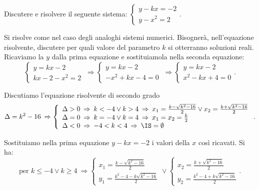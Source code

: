 \begin{exrig}
\begin{esempio}
Discutere e risolvere il seguente sistema: $\left\{\begin{array}{l}y-kx=-2\\y-x^2=2\end{array}\right.$.

Si risolve come nel caso degli analoghi sistemi numerici. Bisognerà, nell'equazione risolvente, discutere per quali valore del parametro $k$ si otterranno soluzioni reali. Ricaviamo la $y$ dalla prima equazione e sostituiamola nella seconda equazione:
\[ \left\{\begin{array}{l}y=kx-2\\kx-2-x^2=2\end{array}\right.\ \Rightarrow\left\{\begin{array}{l}y=kx-2\\-x^2+kx-4=0\end{array}\right.\ \Rightarrow\left\{\begin{array}{l}y=kx-2\\x^2-kx+4=0\end{array}\right.. \]

Discutiamo l'equazione risolvente di secondo grado 
\[ \Delta =k^2-16 \:\Rightarrow\left\{
\begin{array}{l}\Delta >0\:\Rightarrow\: k<-4\vee k>4\:\Rightarrow\: x_1=\frac{k-\sqrt{k^2-16}} 2\vee x_2=\frac{k+\sqrt{k^2-16}} 2\\
\Delta =0\:\Rightarrow\: k=-4\vee k=4\:\Rightarrow\: x_1=x_2=\frac k 2 \\
\Delta <0\:\Rightarrow\: -4<k<4\:\Rightarrow\: \IS=\emptyset \end{array}\right.. \]

Sostituiamo nella prima equazione $y-kx=-2$ i valori della $x$ così ricavati. Si ha: \[ \text{per } k\le -4\vee k\ge 4\:\Rightarrow \left\{\begin{array}{l}x_1=\frac{k-\sqrt{k^2-16}} 2 \\y_1=\frac{k^2-4-k\sqrt{k^2-16}} 2\end{array}\right.\vee \left\{\begin{array}{l}x_2=\frac{k+\sqrt{k^2-16}} 2 \\y_2=\frac{k^2-4+k\sqrt{k^2-16}} 2\end{array}\right..\]
\end{esempio}
\end{exrig}
\ovalbox{\risolvii \ref{ese:6.14}, \ref{ese:6.15}}

